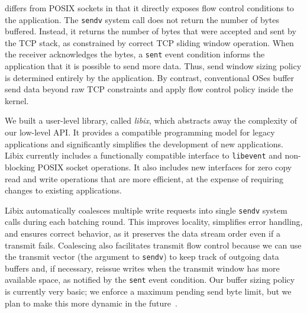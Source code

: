 \ix differs from POSIX sockets in that it directly exposes flow
control conditions to the application. The \texttt{sendv} system call
does not return the number of bytes buffered. Instead, it returns the
number of bytes that were accepted and sent by the TCP stack, as
constrained by correct TCP sliding window operation. When the receiver
acknowledges the bytes, a \texttt{sent} event condition informs the
application that it is possible to send more data. Thus, send window
sizing policy is determined entirely by the application.  By contrast,
conventional OSes buffer send data beyond raw TCP constraints and
apply flow control policy inside the kernel.


We built a user-level library, called \emph{libix}, which abstracts
away the complexity of our low-level API. It provides a compatible
programming model for legacy applications and significantly simplifies
the development of new applications. Libix currently includes a
functionally compatible interface to \texttt{libevent} and
non-blocking POSIX socket operations. It also includes new interfaces
for zero copy read and write operations that are more efficient, at
the expense of requiring changes to existing applications.

Libix automatically coalesces multiple write requests into single
\texttt{sendv} system calls during each batching round. This improves
locality, simplifies error handling, and ensures correct behavior,
as it preserves the data stream order even if a transmit fails.
Coalescing also facilitates transmit flow control because
we can use the transmit vector (the argument to \texttt{sendv})
to keep track of outgoing data buffers and, if necessary, reissue
writes when the transmit window has more available space, as notified
by the \texttt{sent} event condition. Our buffer sizing policy is currently
very basic; we enforce a maximum pending send byte limit, but
we plan to make this more dynamic in the future~\cite{dynamicwindow}.


